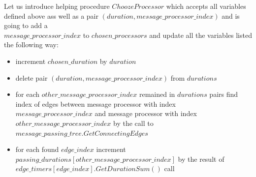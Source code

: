\documentclass{article}
\begin{document}
Let us introduce helping procedure $ChoozeProcessor$ which accepts all variables defined above ass well as a pair $(duration, message\_processor\_index)$ and is going to add a \\
$message\_processor\_index$ to $chosen\_processors$ and update all the variables listed the following way:
\begin{itemize}
	\item increment $chosen\_duration$ by $duration$
	\item delete pair $(duration, message\_processor\_index)$ from $durations$
	\item for each $other\_message\_processor\_index$ remained in $durations$ pairs find index of edges between message processor with index $message\_processor\_index$ and message processor with index $other\_message\_processor\_index$ by the call to \\
		$message\_passing\_tree.GetConnectingEdges$
	\item for each found $edge\_index$ increment \\
		$passing\_durations[other\_message\_processor\_index]$ by the result of \\
		$edge\_timers[edge\_index].GetDurationSum()$ call
\end{itemize}
\end{document}
